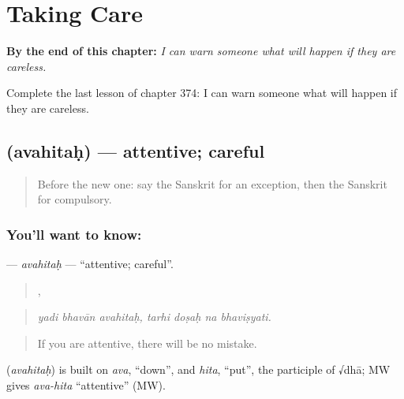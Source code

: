 
\chapter{Taking Care}
\label{ch:sa-taking-care}

\begin{chapteropening}
\textbf{By the end of this chapter:} \emph{I can warn someone what will happen if they are careless.}

Complete the last lesson of chapter 374: I can warn someone what will happen if they are careless.
\end{chapteropening}

\section[\texorpdfstring{\sk{अवहितः} (avahitaḥ)}{अवहितः (avahitaḥ)}]{ (avahitaḥ) — attentive; careful}

\label{lesson:SA-C374-avahitah}



\begin{quote}
Before the new one: say the Sanskrit for an exception, then the Sanskrit for compulsory.
\end{quote}

\subsection*{You'll want to know: }
\textbf{} — \emph{avahitaḥ} — \textquotedblleft{}attentive; careful\textquotedblright{}.

\begin{quote}
  ,    
\end{quote}

\begin{quote}
\emph{yadi bhavān avahitaḥ, tarhi doṣaḥ na bhaviṣyati.}
\end{quote}

\begin{quote}
If you are attentive, there will be no mistake.
\end{quote}

\begin{cousinweb}
\textbf{} (\emph{avahitaḥ}) is built on \emph{ava}, \textquotedblleft{}down\textquotedblright{}, and \emph{hita}, \textquotedblleft{}put\textquotedblright{}, the participle of √dhā; MW gives \emph{ava-hita} \textquotedblleft{}attentive\textquotedblright{} (MW).
\end{cousinweb}

